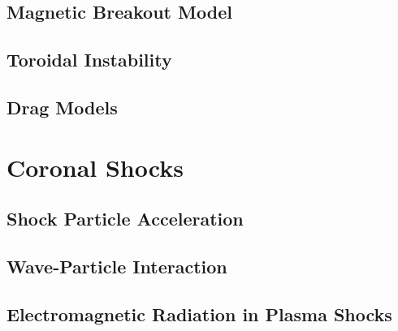 \subsection{Magnetic Breakout Model}\label{sec:21}

\subsection{Toroidal Instability}\label{sec:22}

\subsection{Drag Models}\label{sec:23}


\section{Coronal Shocks}\label{sec:3}

\subsection{Shock Particle Acceleration}\label{sec:30}

\subsection{Wave-Particle Interaction}\label{sec:31}

\subsection{Electromagnetic Radiation in Plasma Shocks}\label{sec:32}
